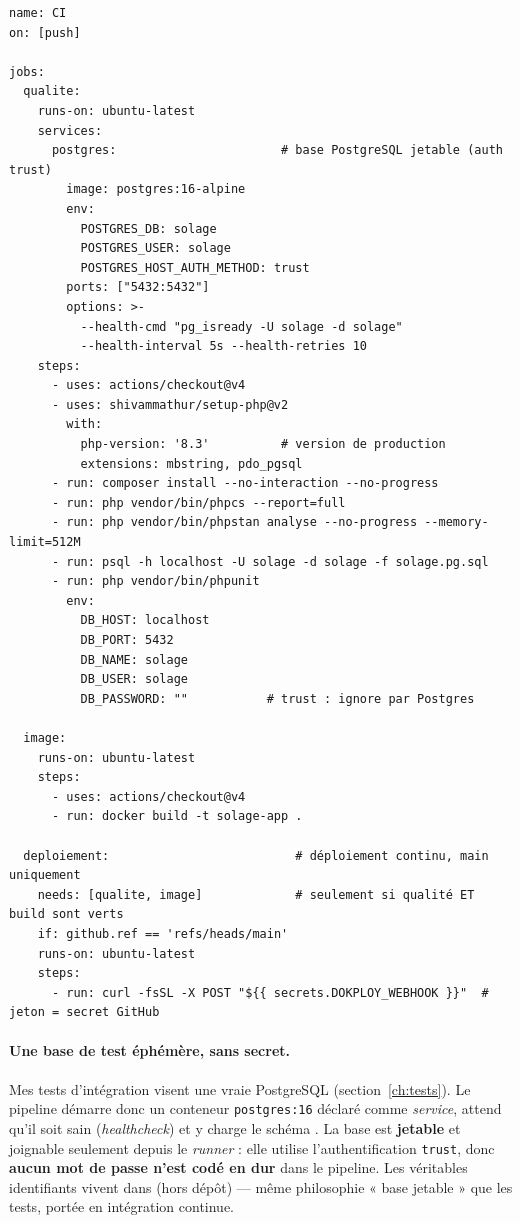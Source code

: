 \begin{lstlisting}[style=yaml, caption={Pipeline d'intégration continue --- extrait de \file{.github/workflows/ci.yml}}]
name: CI
on: [push]

jobs:
  qualite:
    runs-on: ubuntu-latest
    services:
      postgres:                       # base PostgreSQL jetable (auth trust)
        image: postgres:16-alpine
        env:
          POSTGRES_DB: solage
          POSTGRES_USER: solage
          POSTGRES_HOST_AUTH_METHOD: trust
        ports: ["5432:5432"]
        options: >-
          --health-cmd "pg_isready -U solage -d solage"
          --health-interval 5s --health-retries 10
    steps:
      - uses: actions/checkout@v4
      - uses: shivammathur/setup-php@v2
        with:
          php-version: '8.3'          # version de production
          extensions: mbstring, pdo_pgsql
      - run: composer install --no-interaction --no-progress
      - run: php vendor/bin/phpcs --report=full
      - run: php vendor/bin/phpstan analyse --no-progress --memory-limit=512M
      - run: psql -h localhost -U solage -d solage -f solage.pg.sql
      - run: php vendor/bin/phpunit
        env:
          DB_HOST: localhost
          DB_PORT: 5432
          DB_NAME: solage
          DB_USER: solage
          DB_PASSWORD: ""           # trust : ignore par Postgres

  image:
    runs-on: ubuntu-latest
    steps:
      - uses: actions/checkout@v4
      - run: docker build -t solage-app .

  deploiement:                          # déploiement continu, main uniquement
    needs: [qualite, image]             # seulement si qualité ET build sont verts
    if: github.ref == 'refs/heads/main'
    runs-on: ubuntu-latest
    steps:
      - run: curl -fsSL -X POST "${{ secrets.DOKPLOY_WEBHOOK }}"  # jeton = secret GitHub
\end{lstlisting}

\paragraph{Une base de test éphémère, sans secret.} Mes tests d'intégration visent une vraie
PostgreSQL (section~\ref{ch:tests}). Le pipeline démarre donc un conteneur \texttt{postgres:16}
déclaré comme \emph{service}, attend qu'il soit sain (\emph{healthcheck}) et y charge le schéma
. La base est \textbf{jetable} et joignable seulement depuis le \emph{runner} :
elle utilise l'authentification \texttt{trust}, donc \textbf{aucun mot de passe n'est codé en dur}
dans le pipeline. Les véritables identifiants vivent dans  (hors dépôt) --- même
philosophie « base jetable » que les tests, portée en intégration continue.

